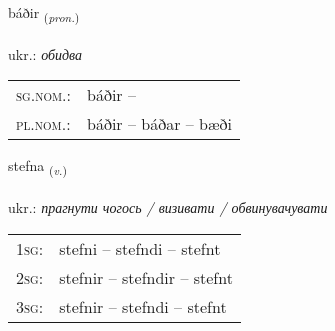 \documentclass[frontgrid, backgrid]{flacards}\usepackage[]{graphicx}\usepackage[]{xcolor}
\begin{document}
\renewcommand{\flhead}{\vskip5pt \fboxsep=0pt {\small\bfseries\footnotesize Fornafn | займенник}}
\renewcommand{\fcfoot}{\vskip5pt \fboxsep=0pt \hspace{2pt}{\small\bfseries\footnotesize 1K}}

\renewcommand{\blhead}{\vskip5pt {\small\bfseries\footnotesize Fornafn | займенник }}
\renewcommand{\bcfoot}{\vskip5pt \hspace{2pt}{\small\bfseries\footnotesize 1K}}


{báðir \small{\textsubscript{(\textit{pron.})}} \\[1ex] %
\textphonetic{[pauːðɪr]} \\
ukr.: \emph{обидва} \\  [2ex]
\renewcommand*{\arraystretch}{0.8}
\begin{tabular}{ll}
\textsc{sg.nom.}: & báðir  -- \\ 
\textsc{pl.nom.}: & báðir -- báðar -- bæði
\end{tabular}
}

\renewcommand{\flhead}{\vskip5pt \fboxsep=0pt {\small\bfseries\footnotesize Sagnorð | дієслово}}
\renewcommand{\fcfoot}{\vskip5pt \fboxsep=0pt \hspace{2pt}{\small\bfseries\footnotesize 1K}}

\renewcommand{\blhead}{\vskip5pt {\small\bfseries\footnotesize Sagnorð | дієслово }}
\renewcommand{\bcfoot}{\vskip5pt \hspace{2pt}{\small\bfseries\footnotesize 1K}}


{stefna \small{\textsubscript{(\textit{v.})}} \\[1ex] %
\textphonetic{[stɛpna]} \\
ukr.: \emph{прагнути чогось / визивати / обвинувачувати} \\  [2ex]
\renewcommand*{\arraystretch}{0.8}
\begin{tabular}{p{1cm}l}
\textsc{1sg}: & stefni -- stefndi -- stefnt \\ 
\textsc{2sg}: & stefnir -- stefndir -- stefnt \\ 
\textsc{3sg}: & stefnir -- stefndi -- stefnt \\ 
\end{tabular}
}
\end{document}
